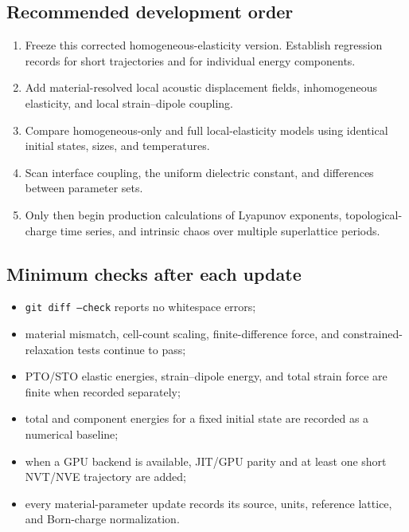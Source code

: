 \documentclass[11pt,a4paper]{article}
\begin{document}
\subsection{Recommended development order}
\begin{enumerate}
  \item Freeze this corrected homogeneous-elasticity version. Establish regression records for short trajectories and for individual energy components.
  \item Add material-resolved local acoustic displacement fields, inhomogeneous elasticity, and local strain--dipole coupling.
  \item Compare homogeneous-only and full local-elasticity models using identical initial states, sizes, and temperatures.
  \item Scan interface coupling, the uniform dielectric constant, and differences between parameter sets.
  \item Only then begin production calculations of Lyapunov exponents, topological-charge time series, and intrinsic chaos over multiple superlattice periods.
\end{enumerate}

\subsection{Minimum checks after each update}
\begin{itemize}
  \item \texttt{git diff --check} reports no whitespace errors;
  \item material mismatch, cell-count scaling, finite-difference force, and constrained-relaxation tests continue to pass;
  \item PTO/STO elastic energies, strain--dipole energy, and total strain force are finite when recorded separately;
  \item total and component energies for a fixed initial state are recorded as a numerical baseline;
  \item when a GPU backend is available, JIT/GPU parity and at least one short NVT/NVE trajectory are added;
  \item every material-parameter update records its source, units, reference lattice, and Born-charge normalization.
\end{itemize}

\appendix
\end{document}
